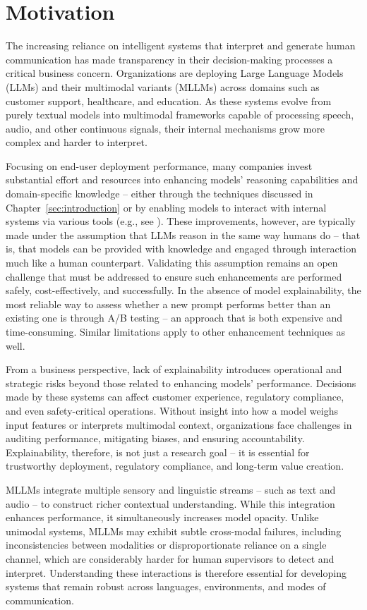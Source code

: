 \chapter{Motivation}
\label{sec:business_goal}

The increasing reliance on intelligent systems that interpret and generate human communication has made transparency in their decision-making processes a critical business concern. Organizations are deploying Large Language Models (LLMs) and their multimodal variants (MLLMs) across domains such as customer support, healthcare, and education. As these systems evolve from purely textual models into multimodal frameworks capable of processing speech, audio, and other continuous signals, their internal mechanisms grow more complex and harder to interpret.

Focusing on end-user deployment performance, many companies invest substantial effort and resources into enhancing models’ reasoning capabilities and domain-specific knowledge -- either through the techniques discussed in Chapter~\ref{sec:introduction} or by enabling models to interact with internal systems via various tools (e.g., see \textcite{chen-etal-2024-towards-tool}). These improvements, however, are typically made under the assumption that LLMs reason in the same way humans do -- that is, that models can be provided with knowledge and engaged through interaction much like a human counterpart. Validating this assumption remains an open challenge that must be addressed to ensure such enhancements are performed safely, cost-effectively, and successfully. In the absence of model explainability, the most reliable way to assess whether a new prompt performs better than an existing one is through A/B testing -- an approach that is both expensive and time-consuming. Similar limitations apply to other enhancement techniques as well.

From a business perspective, lack of explainability introduces operational and strategic risks beyond those related to enhancing models' performance. Decisions made by these systems can affect customer experience, regulatory compliance, and even safety-critical operations. Without insight into how a model weighs input features or interprets multimodal context, organizations face challenges in auditing performance, mitigating biases, and ensuring accountability. Explainability, therefore, is not just a research goal -- it is essential for trustworthy deployment, regulatory compliance, and long-term value creation.

\newpage
MLLMs integrate multiple sensory and linguistic streams -- such as text and audio -- to construct richer contextual understanding. While this integration enhances performance, it simultaneously increases model opacity. Unlike unimodal systems, MLLMs may exhibit subtle cross-modal failures, including inconsistencies between modalities or disproportionate reliance on a single channel, which are considerably harder for human supervisors to detect and interpret. Understanding these interactions is therefore essential for developing systems that remain robust across languages, environments, and modes of communication.

